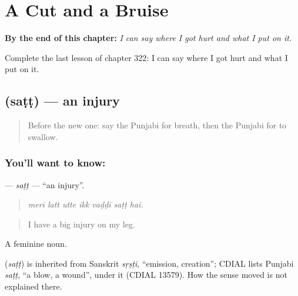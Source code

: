 
\chapter{A Cut and a Bruise}
\label{ch:pa-a2-a-cut-and-a-bruise}

\begin{chapteropening}
\textbf{By the end of this chapter:} \emph{I can say where I got hurt and what I put on it.}

Complete the last lesson of chapter 322: I can say where I got hurt and what I put on it.
\end{chapteropening}

\section[\texorpdfstring{\pa{ਸੱਟ} (saṭṭ)}{ਸੱਟ (saṭṭ)}]{ (saṭṭ) — an injury}

\label{lesson:PA-C322-satt}



\begin{quote}
Before the new one: say the Punjabi for breath, then the Punjabi for to swallow.
\end{quote}

\subsection*{You'll want to know: }
\textbf{} — \emph{saṭṭ} — \textquotedblleft{}an injury\textquotedblright{}.

\begin{quote}
      
\end{quote}

\begin{quote}
\emph{merī latt utte ikk vaḍḍī saṭṭ hai.}
\end{quote}

\begin{quote}
I have a big injury on my leg.
\end{quote}

A feminine noun.

\begin{cousinweb}
\textbf{} (\emph{saṭṭ}) is inherited from Sanskrit \emph{sṛṣṭi}, \textquotedblleft{}emission, creation\textquotedblright{}; CDIAL lists Punjabi \emph{saṭṭ}, \textquotedblleft{}a blow, a wound\textquotedblright{}, under it (CDIAL 13579). How the sense moved is not explained there.
\end{cousinweb}

